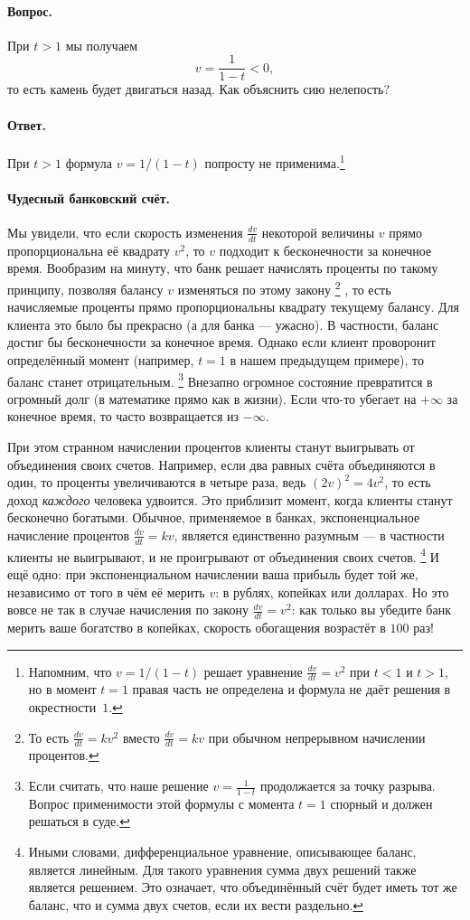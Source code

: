 \paragraph{Вопрос.}
При $t > 1$ мы получаем
\[
v = \frac{1}{1 - t} < 0,
\]
то есть камень будет двигаться назад.
Как объяснить сию нелепость?

\paragraph{Ответ.}
При $t > 1$ формула $v = 1/(1 - t)$ попросту не применима.\footnote{Напомним, что $v = 1/(1 - t)$ решает уравнение $\tfrac{dv}{dt}=v^2$ при $t<1$ и $t>1$, но в момент $t=1$ правая часть не определена и формула не даёт решения в окрестности~$1$.}

\paragraph{Чудесный банковский счёт.}
Мы увидели, что если скорость изменения $\tfrac{dv}{dt}$
некоторой величины $v$ прямо пропорциональна её квадрату $v^{2}$,
то $v$ подходит к бесконечности за конечное время.
Вообразим на минуту, что банк решает начислять проценты по такому принципу,
позволяя балансу $v$ изменяться по этому закону%
\footnote{То есть $\tfrac{dv}{dt} = kv^2$ вместо $\tfrac{dv}{dt} = kv$ при обычном непрерывном начислении процентов.}%
, то есть начисляемые проценты прямо пропорциональны квадрату текущему балансу.
Для клиента это было бы прекрасно (а для банка --- ужасно).
В частности, баланс достиг бы бесконечности за конечное время.
Однако если клиент проворонит определённый момент (например, $t = 1$ в нашем предыдущем примере), то баланс станет отрицательным.%
\footnote{Если считать, что наше решение
$v = \frac{1}{1 - t}$ продолжается за точку разрыва. Вопрос применимости этой формулы с момента $t = 1$ спорный и должен решаться в суде.}
Внезапно огромное состояние превратится в огромный долг (в математике прямо как в жизни).
Если что-то убегает на $+\infty$ за конечное время, то часто возвращается из $-\infty$.

При этом странном начислении процентов клиенты станут выигрывать от объединения своих счетов.
Например, если два равных счёта объединяются в один,
то проценты увеличиваются в четыре раза, ведь
$(2v)^2 = 4v^2$,
то есть доход \emph{каждого} человека удвоится.
Это приблизит момент, когда клиенты станут бесконечно богатыми.
Обычное,
применяемое в банках, экспоненциальное начисление процентов
$\frac{dv}{dt} = kv$, является единственно разумным ---
в частности клиенты не выигрывают, и не проигрывают
от объединения своих счетов.%
\footnote{Иными словами, дифференциальное уравнение, описывающее баланс, является линейным.
Для такого уравнения сумма двух решений также является решением.
Это означает, что объединённый счёт будет иметь тот же баланс, что и сумма двух счетов, если их вести раздельно.}
И ещё одно: при экспоненциальном начислении ваша прибыль будет той же, независимо от того в чём её мерить $v$: в рублях, копейках или долларах.
Но это вовсе не так в случае начисления по закону $\tfrac{dv}{dt} = v^2$:
как только вы убедите банк мерить ваше богатство в копейках, скорость обогащения возрастёт в $100$ раз!

